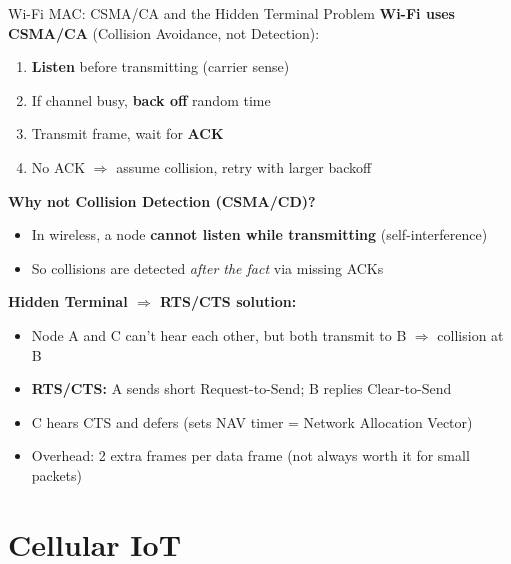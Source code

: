 \documentclass[aspectratio=169,11pt]{beamer}
\begin{document}
\begin{frame}{Wi-Fi MAC: CSMA/CA and the Hidden Terminal Problem}
    \textbf{Wi-Fi uses CSMA/CA} (Collision Avoidance, not Detection):
    
    \begin{enumerate}
        \item \textbf{Listen} before transmitting (carrier sense)
        \item If channel busy, \textbf{back off} random time
        \item Transmit frame, wait for \textbf{ACK}
        \item No ACK $\Rightarrow$ assume collision, retry with larger backoff
    \end{enumerate}
    
    \vspace{0.2cm}
    \textbf{Why not Collision Detection (CSMA/CD)?}
    \begin{itemize}
        \item In wireless, a node \textbf{cannot listen while transmitting} (self-interference)
        \item So collisions are detected \textit{after the fact} via missing ACKs
    \end{itemize}
    
    \vspace{0.2cm}
    \textbf{Hidden Terminal $\Rightarrow$ RTS/CTS solution:}
    \begin{itemize}
        \item Node A and C can't hear each other, but both transmit to B $\Rightarrow$ collision at B
        \item \textbf{RTS/CTS:} A sends short Request-to-Send; B replies Clear-to-Send
        \item C hears CTS and defers (sets NAV timer = Network Allocation Vector)
        \item Overhead: 2 extra frames per data frame (not always worth it for small packets)
    \end{itemize}
\end{frame}

\section{Cellular IoT}
\end{document}

